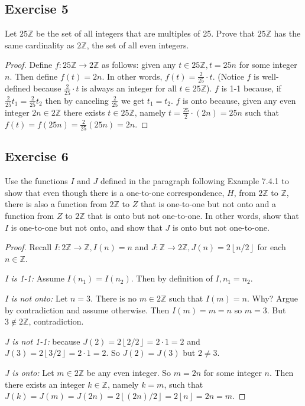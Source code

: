 \documentclass[14pt]{extarticle}
\newcommand{\Z}{\mathbb{Z}}
\newcommand{\floor}[1]{{\left\lfloor#1\right\rfloor}}
\begin{document}
\subsection{Exercise 5}
Let $25\Z$ be the set of all integers that are multiples of 25. Prove that $25\Z$ has the same cardinality as $2\Z$, 
the set of all even integers.

\begin{proof}
Define \(f: 25\Z \to 2\Z\) as follows: given any \(t \in 25\Z, t = 25n\) for some integer $n$. Then define \(f(t) = 
2n\). In other words, \(f(t) = \frac{2}{25} \cdot t\). (Notice $f$ is well-defined because \(\frac{2}{25} \cdot 
t\) is always an integer for all \(t \in 25\Z\)). $f$ is 1-1 because, if \(\frac{2}{25}t_1 = \frac{2}{25}t_2\) then 
by canceling $\frac{2}{25}$ we get \(t_1 = t_2\). $f$ is onto because, given any even integer \(2n \in 2\Z\) there 
exists \(t \in 25\Z\), namely \(t = \frac{25}{2} \cdot (2n) = 25n\) such that \(f(t) = f(25n) = \frac{2}{25}(25n) = 2n\).
\end{proof}

\subsection{Exercise 6}
Use the functions $I$ and $J$ defined in the paragraph following Example 7.4.1 to show that even though there is a 
one-to-one correspondence, $H$, from $2\Z$ to $\Z$, there is also a function from $2\Z$ to $Z$ that is one-to-one but 
not onto and a function from $Z$ to $2\Z$ that is onto but not one-to-one. In other words, show that $I$ is one-to-one 
but not onto, and show that $J$ is onto but not one-to-one.

\begin{proof}
Recall \(I: 2\Z \to \Z, I(n) = n\) and \(J: \Z \to 2\Z, J(n) = 2\floor{n/2}\) for each \(n \in \Z\).

{\it I is 1-1:} Assume \(I(n_1) = I(n_2)\). Then by definition of \(I, n_1 = n_2\).

{\it I is not onto:} Let \(n = 3\). There is no \(m \in 2\Z\) such that \(I(m) = n\). Why? Argue by contradiction
and assume otherwise. Then \(I(m) = m = n\) so \(m = 3\). But \(3 \notin 2\Z\), contradiction.

{\it J is not 1-1:} because \(J(2) = 2\floor{2/2} = 2 \cdot 1 = 2\) and \(J(3) = 2\floor{3/2} = 2 \cdot 1 = 2\). So
\(J(2) = J(3)\) but \(2 \neq 3\).

{\it J is onto:} Let \(m \in 2\Z\) be any even integer. So \(m = 2n\) for some integer $n$. Then there exists an 
integer $k \in \Z$, namely $k = m$, such that \(J(k) = J(m) = J(2n) = 2\floor{(2n)/2} = 2\floor{n} = 2n = m\).
\end{proof}
\end{document}
